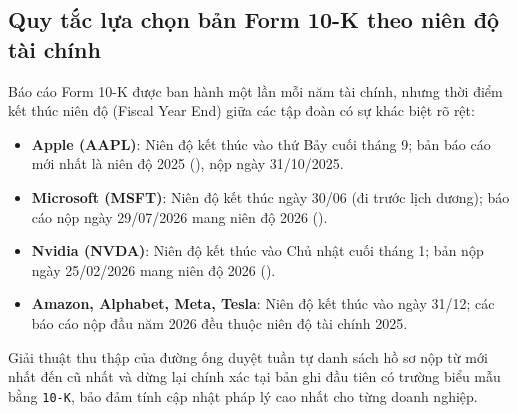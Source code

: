 \subsection{Quy tắc lựa chọn bản Form 10-K theo niên độ tài chính}
Báo cáo Form 10-K được ban hành một lần mỗi năm tài chính, nhưng thời điểm kết thúc niên độ (Fiscal Year End) giữa các tập đoàn có sự khác biệt rõ rệt:
\begin{itemize}
    \item \textbf{Apple (AAPL)}: Niên độ kết thúc vào thứ Bảy cuối tháng 9; bản báo cáo mới nhất là niên độ 2025 (), nộp ngày 31/10/2025.
    \item \textbf{Microsoft (MSFT)}: Niên độ kết thúc ngày 30/06 (đi trước lịch dương); báo cáo nộp ngày 29/07/2026 mang niên độ 2026 ().
    \item \textbf{Nvidia (NVDA)}: Niên độ kết thúc vào Chủ nhật cuối tháng 1; bản nộp ngày 25/02/2026 mang niên độ 2026 ().
    \item \textbf{Amazon, Alphabet, Meta, Tesla}: Niên độ kết thúc vào ngày 31/12; các báo cáo nộp đầu năm 2026 đều thuộc niên độ tài chính 2025.
\end{itemize}
Giải thuật thu thập của đường ống duyệt tuần tự danh sách hồ sơ nộp từ mới nhất đến cũ nhất và dừng lại chính xác tại bản ghi đầu tiên có trường biểu mẫu bằng \texttt{10-K}, bảo đảm tính cập nhật pháp lý cao nhất cho từng doanh nghiệp.
